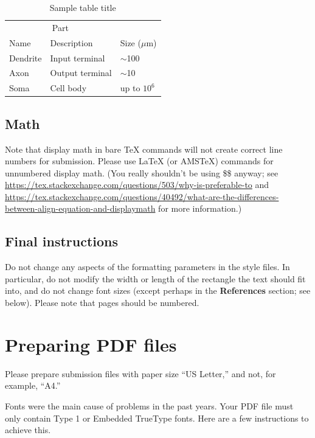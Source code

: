 \documentclass{article}
\begin{document}
	
	\begin{table}
		\caption{Sample table title}
		\label{sample-table}
		\centering
		\begin{tabular}{lll}
			\toprule
			\multicolumn{2}{c}{Part}                   \\
			\cmidrule(r){1-2}
			Name     & Description     & Size ($\mu$m) \\
			\midrule
			Dendrite & Input terminal  & $\sim$100     \\
			Axon     & Output terminal & $\sim$10      \\
			Soma     & Cell body       & up to $10^6$  \\
			\bottomrule
		\end{tabular}
	\end{table}
	
	\subsection{Math}
	Note that display math in bare TeX commands will not create correct line numbers for submission. Please use LaTeX (or AMSTeX) commands for unnumbered display math. (You really shouldn't be using \$\$ anyway; see \url{https://tex.stackexchange.com/questions/503/why-is-preferable-to} and \url{https://tex.stackexchange.com/questions/40492/what-are-the-differences-between-align-equation-and-displaymath} for more information.)
	
	\subsection{Final instructions}
	
	Do not change any aspects of the formatting parameters in the style files.  In
	particular, do not modify the width or length of the rectangle the text should
	fit into, and do not change font sizes (except perhaps in the
	\textbf{References} section; see below). Please note that pages should be
	numbered.
	
	
	\section{Preparing PDF files}
	
	
	Please prepare submission files with paper size ``US Letter,'' and not, for
	example, ``A4.''
	
	
	Fonts were the main cause of problems in the past years. Your PDF file must only
	contain Type 1 or Embedded TrueType fonts. Here are a few instructions to
	achieve this.
	
\end{document}
